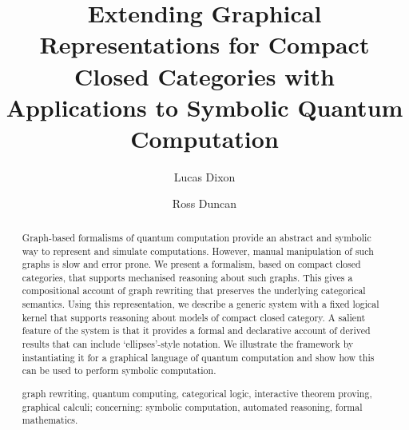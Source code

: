 \documentclass[runningheads]{llncs}
\newcommand{\keywords}[1]{\par\addvspace\baselineskip
\noindent\keywordname\enspace\ignorespaces#1}
\begin{document}
\mainmatter  %

\title{Extending Graphical Representations for Compact Closed Categories with
Applications to Symbolic Quantum Computation}


%
%
\author{Lucas Dixon \and Ross Duncan}
%


%
%
\maketitle


\begin{abstract}
  Graph-based formalisms of quantum computation provide an
  abstract and symbolic way to represent and simulate computations.
  However, manual manipulation of such graphs is slow and error prone.
  We present a formalism, based on compact closed categories, that
  supports mechanised reasoning about such graphs. This gives a
  compositional account of graph rewriting that preserves the
  underlying categorical semantics. Using this representation, we
  describe a generic system with a fixed logical kernel that supports
  reasoning about models of compact closed category. A salient feature
  of the system is that it provides a formal and declarative account
  of derived results that can include `ellipses'-style notation. We
  illustrate the framework by instantiating it for a graphical
  language of quantum computation and show how this can be used to
  perform symbolic computation.

  \keywords{graph rewriting, quantum computing, categorical logic,
    interactive theorem proving, graphical calculi; concerning:
    symbolic computation, automated reasoning, formal mathematics.}
\end{abstract}
\end{document}
